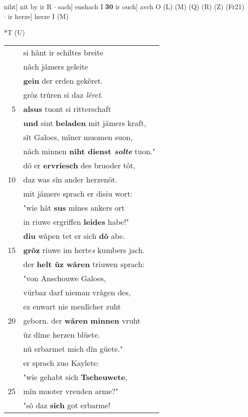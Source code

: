 \documentclass[8pt,a4paper,notitlepage]{article}
\begin{document}
\begin{table}[ht]
\begin{minipage}[t]{0.5\linewidth}
niht] nit by ir R  $\cdot$ sach] enshach I \textbf{30} ir ouch] avch O (L) (M) (Q) (R) (Z) (Fr21)  $\cdot$ ir herze] herze I (M) \newline
\end{minipage}
\hspace{0.5cm}
\begin{minipage}[t]{0.5\linewidth}
\small
\begin{center}*T (U)
\end{center}
\begin{tabular}{rl}
 & si hânt ir schiltes breite\\ 
 & nâch jâmers geleite\\ 
 & \textbf{gein} der erden gekêret.\\ 
 & grôz trûren si daz \textit{lêret}.\\ 
5 & \textbf{alsus} tuont si ritterschaft\\ 
 & \textbf{und} sint \textbf{beladen} mit jâmers kraft,\\ 
 & sît Galoes, mîner muomen suon,\\ 
 & nâch minnen \textbf{niht dienst \textit{solte}} tuon."\\ 
 & dô er \textbf{ervriesch} des bruoder tôt,\\ 
10 & daz was sîn ander herzenôt.\\ 
 & mit jâmere sprach er disiu wort:\\ 
 & "wie hât \textbf{sus} mînes ankers ort\\ 
 & in riuwe ergriffen \textbf{leides} habe!"\\ 
 & \textbf{diu} wâpen tet er sich \textbf{dô} abe.\\ 
15 & \textbf{grôz} riuwe im herte\textit{s} kumbers jach.\\ 
 & der \textbf{helt ûz wâren} triuwen sprach:\\ 
 & "von Anschouwe Galoes,\\ 
 & vürbaz darf nieman vrâgen des,\\ 
 & ez enwart nie menlîcher zuht\\ 
20 & geborn. der \textbf{wâren} \textbf{minnen} vruht\\ 
 & ûz dîme herzen blüete.\\ 
 & nû erbarmet mich dîn güete."\\ 
 & er sprach zuo Kaylete:\\ 
 & "wie gehabt sich \textbf{Tscheuwete},\\ 
25 & mîn muoter vreuden arme?"\\ 
 & "sô daz \textbf{sich} got erbarme!\\ 

\end{tabular}
\end{minipage}
\end{table}
\end{document}
